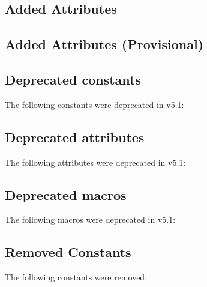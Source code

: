\subsection{Added Attributes}

\subsection{Added Attributes (Provisional)}

\subsection{Deprecated constants}

The following constants were deprecated in v5.1:

\subsection{Deprecated attributes}

The following attributes were deprecated in v5.1:

\subsection{Deprecated macros}

The following macros were deprecated in v5.1:

\subsection{Removed Constants}

The following constants were removed:


